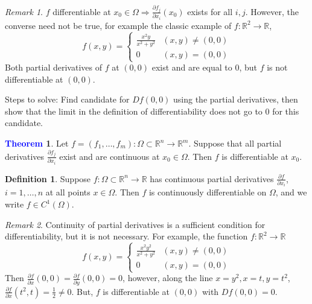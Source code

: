 \documentclass[11pt]{article}
\theoremstyle{definition}
\theoremstyle{definition}
\newcommand{\R}[0]{\mathbb{R}}
\newcommand{\pdv}[2]{\frac{\partial #1}{\partial #2}}
\newtheorem{theorem}{\textcolor{blue}{Theorem}}
\theoremstyle{definition}
\newtheorem{definition}{\textcolor{OliveGreen}{Definition}}
\theoremstyle{remark}
\newtheorem*{remark}{Remark}
\begin{document}
\begin{remark}
    $f$ differentiable at $x_0 \in \Omega \Rightarrow \pdv{f_j}{x_i} (x_0)$ exists for all $i, j$.
    However, the converse need not be true, for example the classic example of $f : \R^2 \to \R$,
    \[
        f(x, y) = \begin{cases}
            \frac{x^2 y}{x^2 + y^2} & (x, y) \neq (0, 0) \\
            0 & (x, y) = (0, 0)
        \end{cases}
    \]    
    Both partial derivatives of $f$ at $(0, 0)$ exist and are equal to $0$, but $f$ is not 
    differentiable at $(0, 0)$.

    Steps to solve: Find candidate for $Df(0, 0)$ using the partial derivatives, then show
    that the limit in the definition of differentiability does not go to $0$ for this candidate. 
\end{remark}

\begin{theorem}
    Let $f = (f_1, \dots, f_m) : \Omega \subset \R^n \to \R^m$. Suppose that all partial
    derivatives $\pdv{f_j}{x_i}$ exist and are continuous at $x_0 \in \Omega$. 
    Then $f$ is differentiable at $x_0$.
\end{theorem}

\begin{definition}
    Suppose $f : \Omega \subset \R^n \to \R$ has continuous partial derivatives 
    $\pdv{f}{x_i}$, $i = 1, \dots, n$ at all points $x \in \Omega$. Then $f$ is 
    continuously differentiable on $\Omega$, and we write $f \in C^1(\Omega)$.     
\end{definition}

\begin{remark}
    Continuity of partial derivatives is a sufficient condition for differentiability, but 
    it is not necessary. For example, the function $f : \R^2 \to \R$
    \[
        f(x, y) = \begin{cases}
            \frac{x^2y^2}{x^2 + y^2} & (x, y) \neq (0, 0) \\
            0 & (x, y) = (0, 0)
        \end{cases}
    \]  
    Then $\pdv{f}{x}(0, 0) = \pdv{f}{y}(0, 0) = 0$, however, along the line $x = y^2, x = t, y = t^2$,
    $\pdv{f}{x}(t^2, t) = \frac{1}{2} \neq 0$. But, $f$ is differentiable at 
    $(0, 0)$ with $Df(0, 0) = 0$.
\end{remark}
\end{document}
